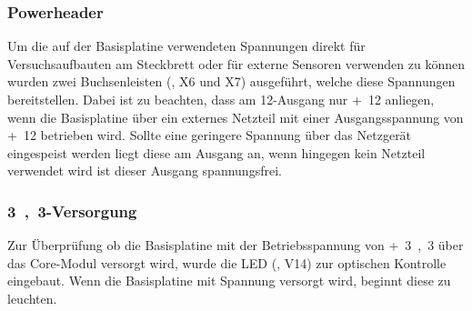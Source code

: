 
\subsubsection{Powerheader}
Um die auf der \gls{Basisplatine} verwendeten Spannungen direkt für Versuchsaufbauten am Steckbrett oder für externe Sensoren verwenden zu können wurden zwei Buchsenleisten (, X6 und X7) ausgeführt, welche diese Spannungen bereitstellen. Dabei ist zu beachten, dass am \unit{12}{\volt}-Ausgang nur \unit{+12}{\volt} anliegen, wenn die Basisplatine über ein externes Netzteil mit einer Ausgangsspannung von \unit{+12}{\volt} betrieben wird. Sollte eine geringere Spannung über das Netzgerät eingespeist werden liegt diese am Ausgang an, wenn hingegen kein Netzteil verwendet wird ist dieser Ausgang spannungsfrei.


\subsubsection{\unit{3,3}{\volt}-Versorgung}
Zur Überprüfung ob die \gls{Basisplatine} mit der Betriebsspannung von \unit{+3,3}{\volt} über das \gls{Core-Modul} versorgt wird, wurde die LED (, V14) zur optischen Kontrolle eingebaut. Wenn die Basisplatine mit Spannung versorgt wird, beginnt diese zu leuchten.


